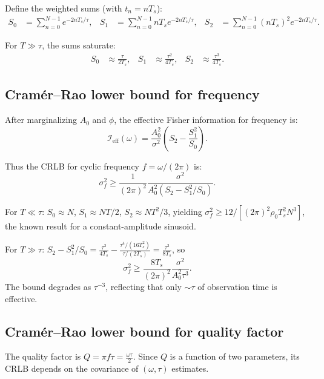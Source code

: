 \documentclass[11pt]{article}
\begin{document}
Define the weighted sums (with $t_n = nT_s$):
\begin{align}
S_0 &= \sum_{n=0}^{N-1} e^{-2nT_s/\tau}, &
S_1 &= \sum_{n=0}^{N-1} nT_s e^{-2nT_s/\tau}, &
S_2 &= \sum_{n=0}^{N-1} (nT_s)^2 e^{-2nT_s/\tau}.
\end{align}

For $T \gg \tau$, the sums saturate:
\begin{align}
S_0 &\approx \frac{\tau}{2T_s}, &
S_1 &\approx \frac{\tau^2}{4T_s}, &
S_2 &\approx \frac{\tau^3}{4T_s}.
\end{align}

\subsection{Cram\'er--Rao lower bound for frequency}

After marginalizing $A_0$ and $\phi$, the effective Fisher information for frequency is:
\begin{equation}
\mathcal{I}_{\text{eff}}(\omega) = \frac{A_0^2}{\sigma^2}
\left(
S_2 - \frac{S_1^2}{S_0}
\right).
\end{equation}

Thus the CRLB for cyclic frequency $f = \omega/(2\pi)$ is:
\begin{equation}
\boxed{
\sigma_f^2 \ge \frac{1}{(2\pi)^2} \frac{\sigma^2}{A_0^2\left(S_2 - S_1^2/S_0\right)}.
\label{eq:crlb-ringdown}
}
\end{equation}

For $T \ll \tau$: $S_0 \approx N$, $S_1 \approx NT/2$, $S_2 \approx NT^2/3$, yielding
$\sigma_f^2 \ge 12/[ (2\pi)^2 \rho_0 T_s^2 N^3 ]$, the known result for a constant-amplitude sinusoid.

For $T \gg \tau$: $S_2 - S_1^2/S_0 = \frac{\tau^3}{4T_s} - \frac{\tau^4/(16T_s^2)}{\tau/(2T_s)} = \frac{\tau^3}{8T_s}$, so
\begin{equation}
\sigma_f^2 \ge \frac{8T_s}{(2\pi)^2} \frac{\sigma^2}{A_0^2 \tau^3}.
\end{equation}
The bound degrades as $\tau^{-3}$, reflecting that only $\sim \tau$ of observation time is effective.

\subsection{Cram\'er--Rao lower bound for quality factor}

The quality factor is $Q = \pi f \tau = \frac{\omega \tau}{2}$. Since $Q$ is a function of two parameters, its CRLB depends on the covariance of $(\omega, \tau)$ estimates.
\end{document}
